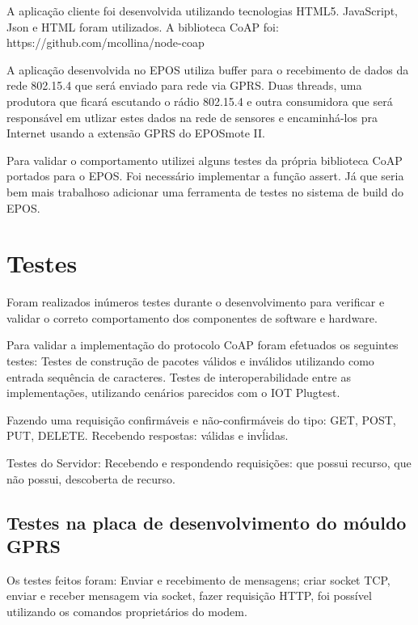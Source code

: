 A aplica\c{c}\~ao cliente foi desenvolvida utilizando tecnologias HTML5. JavaScript, Json e HTML foram utilizados.
A biblioteca CoAP foi:\\https://github.com/mcollina/node-coap

A aplica\c{c}\~ao desenvolvida no EPOS utiliza buffer para o recebimento de dados da rede 802.15.4 que ser\'a enviado para rede via GPRS. Duas threads, uma produtora que ficar\'a escutando o r\'adio 802.15.4 e outra consumidora que ser\'a respons\'avel em utlizar estes dados na rede de sensores e encaminh\'a-los pra Internet usando a extens\~ao GPRS do EPOSmote II.

Para validar o comportamento utilizei alguns testes da pr\'opria biblioteca CoAP portados para o EPOS. Foi necess\'ario implementar a fun\c{c}\~ao assert. J\'a que seria bem mais trabalhoso adicionar uma ferramenta de testes no sistema de build do EPOS.

\section{Testes}

Foram realizados in\'umeros testes durante o desenvolvimento para verificar e validar o correto comportamento dos componentes de software e hardware.

Para validar a implementa\c{c}\~ao do protocolo CoAP foram efetuados os seguintes testes:
Testes de constru\c{c}\~ao de pacotes v\'alidos e inv\'alidos utilizando como entrada sequ\^encia de caracteres.
Testes de interoperabilidade entre as implementa\c{c}\~oes, utilizando cen\'arios parecidos com o IOT Plugtest.


Fazendo uma requisi\c{c}\~ao confirm\'aveis e n\~ao-confirm\'aveis do tipo: GET, POST, PUT, DELETE.
Recebendo respostas: v\'alidas e inv\'lidas.

Testes do Servidor:
Recebendo e respondendo requisi\c{c}\~oes: que possui recurso, que n\~ao possui, descoberta de recurso.

\subsection{Testes na placa de desenvolvimento do m\'ouldo GPRS}
Os testes feitos foram: Enviar e recebimento de mensagens; criar socket TCP, enviar e receber mensagem via socket, fazer requisi\c{c}\~ao HTTP, foi poss\'ivel utilizando os comandos propriet\'arios do modem.
